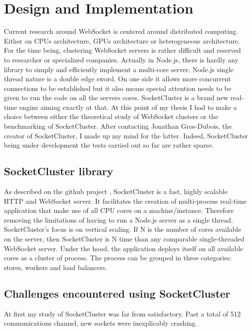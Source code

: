 
\chapter{Design and Implementation} 
\label{Chapter3} 

Current research around WebSocket is centered around distributed computing. Either
on CPUs architecture, GPUs architecture or heterogeneous architecture. For the
time being, clustering WebSocket servers is rather difficult and reserved to
researcher or specialized companies. Actually in Node.js, there is hardly any
library to simply and efficiently implement a multi-core server.  Node.js
single thread nature is a double edge sword. On one side it allows more
concurrent connections to be established but it also means special attention
needs to be given to run the code on all the servers cores. SocketCluster is a
brand new real-time engine aiming exactly at that.  At this point of my thesis
I had to make a choice between either the theoretical study of WebSocket
clusters or the benchmarking of SocketCluster. After contacting Jonathan
Gros-Dubois, the creator of SocketCluster, I made up my mind for the latter.
Indeed, SocketCluster being under development the tests carried out so far are
rather sparse. 

\section{SocketCluster library}

As described on the github project  \citep{Reference38}, SocketCluster is a
fast, highly scalable HTTP and WebSocket server. It facilitates the creation of
multi-process real-time application that make use of all CPU cores on a
machine/instance. Therefore removing the limitations of having to run a Node.js
server as a single thread.  SocketCluster's focus is on vertical scaling. If N
is the number of cores available on the server, then SocketCluster is N time
than any comparable single-threaded WebSocket server. Under the hood, the
application deploys itself on all available cores as a cluster of process. The
process can be grouped in three categories: stores, workers and load balancers.

\section{Challenges encountered using SocketCluster}

At first my study of SocketCluster was far from satisfactory. Past a
total of 512 communications channel, new sockets were inexplicably crashing.

